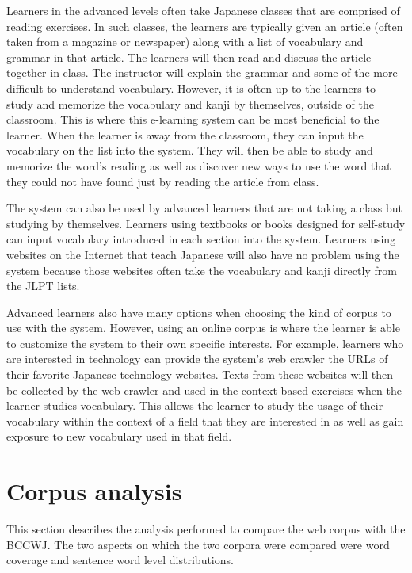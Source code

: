 \documentclass[english]{jnlp_1.4}
\begin{document}
Learners in the advanced levels often take Japanese classes that are comprised of reading exercises. In such classes, the learners are typically given an article (often taken from a magazine or newspaper) along with a list of vocabulary and grammar in that article. The learners will then read and discuss the article together in class. The instructor will explain the grammar and some of the more difficult to understand vocabulary. However, it is often up to the learners to study and memorize the vocabulary and kanji by themselves, outside of the classroom. This is where this e-learning system can be most beneficial to the learner. When the learner is away from the classroom, they can input the vocabulary on the list into the system. They will then be able to study and memorize the word's reading as well as discover new ways to use the word that they could not have found just by reading the article from class.

The system can also be used by advanced learners that are not taking a class but studying by themselves. Learners using textbooks or books designed for self-study can input vocabulary introduced in each section into the system. Learners using websites on the Internet that teach Japanese will also have no problem using the system because those websites often take the vocabulary and kanji directly from the JLPT lists.

Advanced learners also have many options when choosing the kind of corpus to use with the system. However, using an online corpus is where the learner is able to customize the system to their own specific interests. For example, learners who are interested in technology can provide the system's web crawler the URLs of their favorite Japanese technology websites. Texts from these websites will then be collected by the web crawler and used in the context-based exercises when the learner studies vocabulary. This allows the learner to study the usage of their vocabulary within the context of a field that they are interested in as well as gain exposure to new vocabulary used in that field.


\section{Corpus analysis}

This section describes the analysis performed to compare the web corpus with the BCCWJ. The two aspects on which the two corpora were compared were word coverage and sentence word level distributions.
\end{document}
